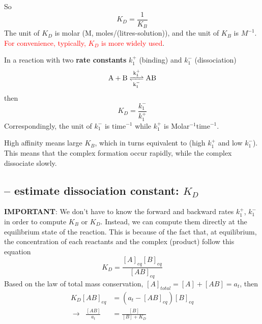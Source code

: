 So
\begin{equation}
  \label{eq:332}
  K_D = \frac{1}{K_B}
\end{equation}
The unit of $K_D$ is molar (M, moles/(litres-solution)), and the unit of $K_B$
is $M^{-1}$.  \textcolor{red}{For convenience, typically, $K_D$ is more widely
used}.

In a reaction with two {\bf rate constants} $k^+_{1}$ (binding) and
$k^-_{1}$ (dissociation)
\begin{equation}
  \label{eq:333}
  \ce{A + B <=>[k^+_1][k^-_{1}] AB}
\end{equation}
then 
\begin{equation}
  \label{eq:334}
  K_D = \frac{k^-_1}{k^+_{1}}
\end{equation}
Correspondingly, the unit of $k^-_{1}$ is $\text{time}^{-1}$ while
$k^+_{1}$ is Molar$^{-1}\text{time}^{-1}$.

\begin{framed}
  
  High affinity means large $K_B$, which in turns equivalent to (high
  $k^+_1$ and low $k^-_{1}$). This means that the complex formation occur
  rapidly, while the complex dissociate slowly.
\end{framed}


\subsection{-- estimate dissociation constant: $K_D$}
\label{sec:determining-k_d}

{\bf IMPORTANT}: We don't have to know the forward and backward rates
$k^+_1$, $k^-_{1}$ in order to compute $K_B$ or $K_D$. Instead, we can
compute them directly at the equilibrium state of the reaction.  This
is because of the fact that, at equilibrium, the concentration of each
reactants and the complex (product) follow this equation
\begin{equation}
  \label{eq:335}
  K_D = \frac{[A]_{eq}[B]_{eq}}{[AB]_{eq}}
\end{equation}
Based on the law of total mass conservation, $[A]_{total}=[A]+[AB]=a_t$,
then 
\begin{equation}
  \label{eq:336}
  \begin{split}
    K_D[AB]_{eq} &= (a_t-[AB]_{eq})[B]_{eq} \\
 \rightarrow\;\;   \frac{[AB]}{a_t} &= \frac{[B]}{[B]+K_D}
  \end{split}
\end{equation}


